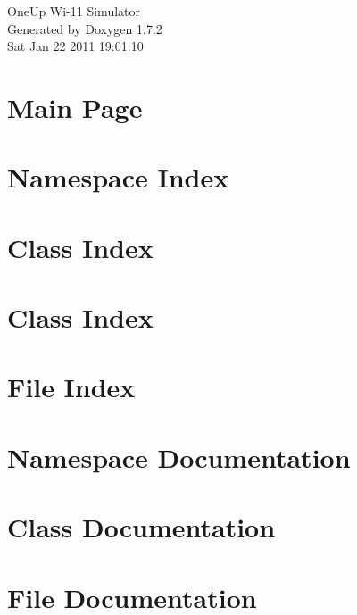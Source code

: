 \documentclass[letterpaper]{book}
\begin{document}
\hypersetup{pageanchor=false}
\begin{titlepage}
\vspace*{7cm}
\begin{center}
{\Large OneUp Wi-\/11 Simulator }\\
\vspace*{1cm}
{\large Generated by Doxygen 1.7.2}\\
\vspace*{0.5cm}
{\small Sat Jan 22 2011 19:01:10}\\
\end{center}
\end{titlepage}
\clearemptydoublepage
{}
\tableofcontents
\clearemptydoublepage
{}
\hypersetup{pageanchor=true}
\chapter{Main Page}
\label{index}\hypertarget{index}{}
\chapter{Namespace Index}

\chapter{Class Index}

\chapter{Class Index}

\chapter{File Index}

\chapter{Namespace Documentation}


\chapter{Class Documentation}


















\chapter{File Documentation}
















\printindex
\end{document}
